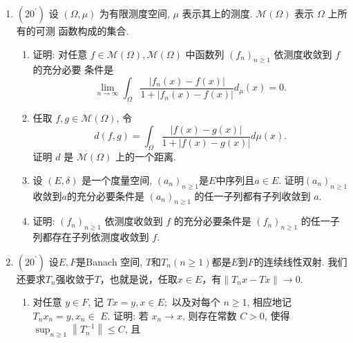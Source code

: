 \begin{enumerate}
\begin{answer}
    \end{answer}
    \item $\left(20^{\prime}\right)$ 
    设 $(\Omega, \mu)$ 为有限测度空间, $\mu$ 表示其上的测度. $\mathcal{M}(\Omega)$ 表示 $\Omega$ 上所有的可测 函数构成的集合.
        \begin{enumerate}
            \item 证明: 对任意 $f \in \mathcal{M}(\Omega), \mathcal{M}(\Omega)$ 中函数列 $\left(f_{n}\right)_{n \geq 1}$ 依测度收敛到 $f$ 的充分必要 条件是
            \[
            \lim _{n \rightarrow \infty} \int_{\Omega} \frac{\left|f_{n}(x)-f(x)\right|}{1+\left|f_{n}(x)-f(x)\right|} d_{\mu}(x)=0.
            \]
            \item 任取 $f, g \in \mathcal{M}(\Omega)$, 令
            \[
            d(f, g)=\int_{\Omega} \frac{|f(x)-g(x)|}{1+|f(x)-g(x)|} d \mu(x).
            \]
            证明 $d$ 是 $\mathcal{M}(\Omega)$ 上的一个距离.
            \item 设 $(E, \delta)$ 是一个度量空间, $\left(a_{n}\right)_{n \geq 1} $是$E$中序列且$a\in E$. 证明$(a_n)_{n\geqslant 1}$收敛到$a$的充分必要条件是 $\left(a_{n}\right)_{n \geq 1}$ 的任一子列都有子列收敛到 $a$.
            \item 证明: $\left(f_{n}\right)_{n \geq 1}$ 依测度收敛到 $f$ 的充分必要条件是 $\left(f_{n}\right)_{n \geq 1} $ 的任一子列都存在子列依测度收敛到 $f$.
        \end{enumerate}
    \item $\left(20^{\prime}\right)$ 
    设$E,F$是Banach 空间, $T$和$T_n(n\geqslant 1)$都是$E$到$F$的连续线性双射. 我们还要求$T_n$强收敛于$T$，也就是说，任取$x\in E$，有$\left\|T_{n} x-T x\right\| \rightarrow 0$.
        \begin{enumerate}
            \item 对任意 $y \in F$, 记 $T x=y, x \in E ;$ 以及对每个 $n \geq 1$, 相应地记 $T_{n} x_{n}=y, x_{n} \in$ $E .$ 证明: 若 $x_{n} \rightarrow x$, 则存在常数 $C>0$, 使得 $\sup _{n \geq 1}\left\|T_{n}^{-1}\right\| \leq C$, 且

\end{enumerate}
\end{enumerate}
